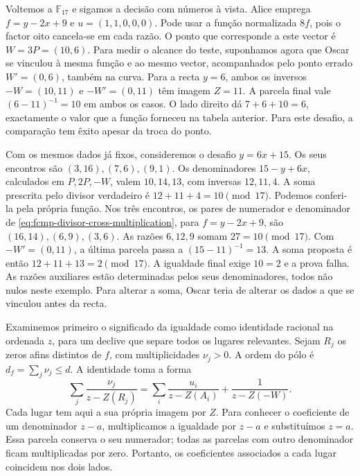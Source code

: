 Voltemos a \(\mathbb F_{17}\) e sigamos a decisão com números à vista.
Alice emprega \(f=y-2x+9\) e \(u=(1,1,0,0,0)\). Pode usar a função
normalizada \(8f\), pois o factor oito cancela-se em cada razão.
O ponto que corresponde a este vector é \(W=3P=(10,6)\). Para medir o alcance do teste, suponhamos agora que Oscar se
vinculou à mesma função e ao mesmo vector, acompanhados pelo
ponto errado \(W'=(0,6)\), também na curva. Para a recta \(y=6\),
ambos os inversos \(-W=(10,11)\) e \(-W'=(0,11)\) têm imagem
\(Z=11\). A parcela final vale \((6-11)^{-1}=10\) em ambos os
casos. O lado direito dá \(7+6+10=6\), exactamente o valor que a
função forneceu na tabela anterior. Para este desafio, a comparação
tem êxito apesar da troca do ponto.

Com os mesmos dados já fixos, consideremos o desafio \(y=6x+15\).
Os seus encontros são \((3,16),(7,6),(9,1)\). Os denominadores
\(15-y+6x\), calculados em \(P,2P,-W\), valem \(10,14,13\),
com inversas \(12,11,4\). A soma prescrita pelo divisor verdadeiro
é \(12+11+4=10\pmod{17}\). Podemos conferi-la pela própria
função. Nos três encontros, os pares de numerador e denominador de
\eqref{eq:fcmp-divisor-cross-multiplication}, para \(f=y-2x+9\),
são \((16,14),(6,9),(3,6)\). As razões \(6,12,9\) somam
\(27=10\pmod{17}\). Com \(-W'=(0,11)\), a última parcela
passa a \((15-11)^{-1}=13\). A soma proposta é então
\(12+11+13=2\pmod{17}\). A igualdade final exige \(10=2\) e a
prova falha. As razões auxiliares estão determinadas pelos seus
denominadores, todos não nulos neste exemplo. Para alterar a soma,
Oscar teria de alterar os dados a que se vinculou antes da recta.

Examinemos primeiro o significado da igualdade como identidade
racional na ordenada \(z\), para um declive que separe todos os
lugares relevantes. Sejam \(R_j\) os zeros afins distintos de
\(f\), com multiplicidades \(\nu_j>0\). A ordem do pólo é
\(d_f=\sum_j\nu_j\leq d\). A identidade toma a forma
\begin{equation}
 \sum_j\frac{\nu_j}{z-Z(R_j)}
 =\sum_i\frac{u_i}{z-Z(A_i)}+\frac1{z-Z(-W)}.
 \label{eq:divisors-residue-identity}
\end{equation}
Cada lugar tem aqui a sua própria imagem por \(Z\). Para conhecer
o coeficiente de um denominador \(z-a\), multiplicamos a igualdade
por \(z-a\) e substituímos \(z=a\). Essa parcela conserva o seu
numerador; todas as parcelas com outro denominador ficam multiplicadas
por zero. Portanto, os coeficientes associados a cada lugar coincidem
nos dois lados.

